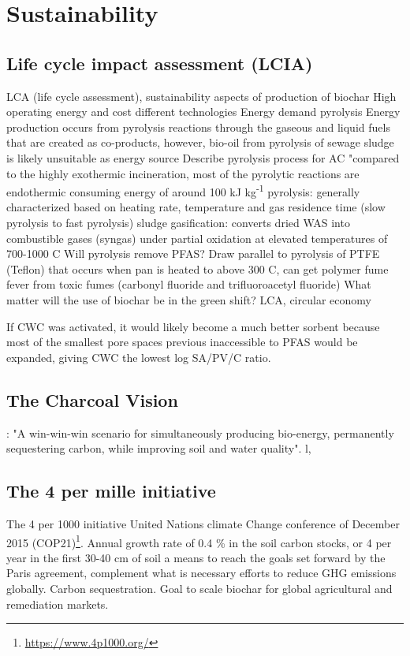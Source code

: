 \section{Sustainability}\label{sec:LCA}
\subsection{Life cycle impact assessment (LCIA)}
LCA (life cycle assessment), sustainability aspects of production of biochar
High operating energy and cost different technologies \citep{Alhashimi2017}
Energy demand pyrolysis 
Energy production occurs from pyrolysis reactions through the gaseous and liquid fuels that are created as co-products, however, bio-oil from pyrolysis of sewage sludge is likely unsuitable as energy source
Describe pyrolysis process for AC
"compared to the highly exothermic incineration, most of the pyrolytic reactions are endothermic consuming energy of around 100 kJ kg\textsuperscript{-1}
pyrolysis: generally characterized based on heating rate, temperature and gas residence time (slow pyrolysis to fast pyrolysis)
sludge gasification: converts dried WAS into combustible gases (syngas) under partial oxidation at elevated temperatures of 700-1000 \textdegree C
Will pyrolysis remove PFAS? Draw parallel to pyrolysis of PTFE (Teflon) that occurs when pan is heated to above 300 \textdegree C, can get polymer fume fever from toxic fumes (carbonyl fluoride and trifluoroacetyl fluoride) 
What matter will the use of biochar be in the green shift? LCA, circular economy

If CWC was activated, it would likely become a much better sorbent because most of the smallest pore spaces previous inaccessible to PFAS would be expanded, giving CWC the lowest log SA/PV/C ratio. 

\subsection{The Charcoal Vision}
\citep{Laird2008}: "A win-win-win scenario for simultaneously producing bio-energy, permanently sequestering carbon, while improving soil and water quality". l, 

\subsection{The 4 per mille initiative}
The 4 per 1000 initiative United Nations climate Change conference of December 2015 (COP21)\footnote{\url{https://www.4p1000.org/}}. Annual growth rate of 0.4 \% in the soil carbon stocks, or 4 \textperthousand  per year in the first 30-40 cm of soil a means to reach the goals set forward by the Paris agreement, complement what is necessary efforts to reduce GHG emissions globally. Carbon sequestration. Goal to scale biochar for global agricultural and remediation markets. 

